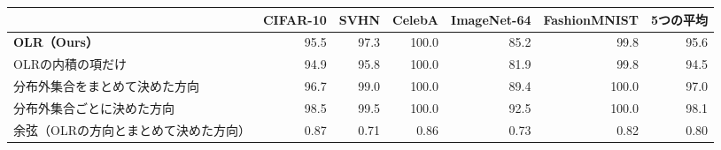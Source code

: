 \documentclass[border=3pt]{standalone}
\begin{document}
%
\begin{tabular}{l*{5}{r}r}%
\toprule
 & CIFAR-10 & SVHN & CelebA & ImageNet-64 & FashionMNIST & 5つの平均\\
\midrule
\textbf{OLR（Ours）} & 95.5 & 97.3 & 100.0 & 85.2 & 99.8 & 95.6\\
OLRの内積の項だけ & 94.9 & 95.8 & 100.0 & 81.9 & 99.8 & 94.5\\
\midrule
分布外集合をまとめて決めた方向 & 96.7 & 99.0 & 100.0 & 89.4 & 100.0 & 97.0\\
分布外集合ごとに決めた方向 & 98.5 & 99.5 & 100.0 & 92.5 & 100.0 & 98.1\\
\midrule
余弦（OLRの方向とまとめて決めた方向） & 0.87 & 0.71 & 0.86 & 0.73 & 0.82 & 0.80\\
\bottomrule
\end{tabular}%
\end{document}
